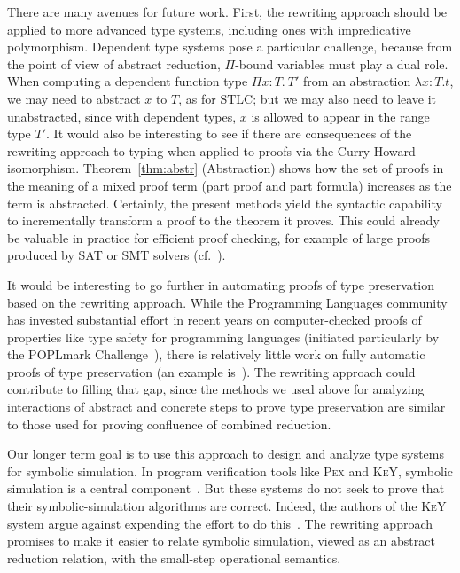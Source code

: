 \documentclass{LMCS}
\begin{document}
There are many avenues for future work.  First, the rewriting approach
should be applied to more advanced type systems, including ones with
impredicative polymorphism.  Dependent type systems pose a particular
challenge, because from the point of view of abstract reduction,
$\Pi$-bound variables must play a dual role.  When computing a
dependent function type $\Pi x:T.\ T'$ from an abstraction $\lambda x
: T. t$, we may need to abstract $x$ to $T$, as for STLC; but we may
also need to leave it unabstracted, since with dependent types, $x$ is
allowed to appear in the range type $T'$.  It would also be
interesting to see if there are consequences of the rewriting approach
to typing when applied to proofs via the Curry-Howard isomorphism.
Theorem~\ref{thm:abstr} (Abstraction) shows how the set of proofs in
the meaning of a mixed proof term (part proof and part formula)
increases as the term is abstracted.  Certainly, the present methods
yield the syntactic capability to incrementally transform a proof to
the theorem it proves.  This could already be valuable in practice for
efficient proof checking, for example of large proofs produced by SAT
or SMT solvers (cf.~\cite{stump+12}).

It would be interesting to go further in automating proofs of type
preservation based on the rewriting approach.  While the Programming
Languages community has invested substantial effort in recent years on
computer-checked proofs of properties like type safety for programming
languages (initiated particularly by the POPLmark
Challenge~\cite{poplmark}), there is relatively little work on fully
automatic proofs of type preservation (an example
is~\cite{schurmann+98}).  The rewriting approach could contribute to
filling that gap, since the methods we used above for analyzing
interactions of abstract and concrete steps to prove type preservation
are similar to those used for proving confluence of combined
reduction.

Our longer term goal is to use this approach to design and analyze
type systems for symbolic simulation.  In program verification tools
like \textsc{Pex} and \textsc{KeY}, symbolic simulation is a central
component~\cite{KeyBook2007,Tillmann+2005}.  But these systems do not
seek to prove that their symbolic-simulation algorithms are correct.
Indeed, the authors of the \textsc{KeY} system argue against expending
the effort to do this~\cite{Beckert+06}.  The rewriting approach
promises to make it easier to relate symbolic simulation, viewed as an
abstract reduction relation, with the small-step operational
semantics.
\end{document}
